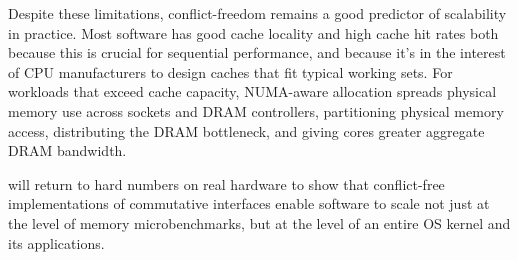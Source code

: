 Despite these limitations, conflict-freedom remains a good predictor
of scalability in practice.  Most software has good cache locality and
high cache hit rates both because this is crucial for sequential
performance, and because it's in the interest of CPU manufacturers to
design caches that fit typical working sets.  For workloads that
exceed cache capacity, NUMA-aware allocation spreads physical memory
use across sockets and DRAM controllers, partitioning physical memory
access, distributing the DRAM bottleneck, and giving cores greater
aggregate DRAM bandwidth.

 will return to hard numbers on real hardware to show
that conflict-free implementations of commutative interfaces enable
software to scale not just at the level of memory microbenchmarks, but
at the level of an entire OS kernel and its applications.







